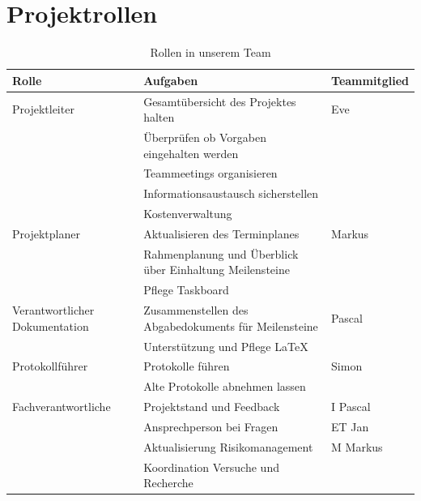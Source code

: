 \documentclass[a4paper]{report}
\begin{document}
\newpage

\section{Projektrollen}
\label{sec:ProjektRollen}
\begin{table}[h!]
	\begin{tabular}{|p{}|p{}|p{}|}
		\hline
		\textbf{Rolle} & \textbf{Aufgaben} & \textbf{Teammitglied} \\
		\hline
		Projektleiter & Gesamtübersicht des Projektes halten  & Eve \\
		& Überprüfen ob Vorgaben eingehalten werden & \\
		& Teammeetings organisieren & \\
		& Informationsaustausch sicherstellen & \\
		& Kostenverwaltung & \\
		\hline
		Projektplaner & Aktualisieren des Terminplanes & Markus\\
		& Rahmenplanung und Überblick über Einhaltung Meilensteine& \\
		& Pflege Taskboard & \\
		\hline
		Verantwortlicher Dokumentation& Zusammenstellen des Abgabedokuments für Meilensteine & Pascal \\
		& Unterstützung und Pflege LaTeX &  \\
		\hline
		Protokollführer & Protokolle führen & Simon \\
		& Alte Protokolle abnehmen lassen & \\
		\hline
		Fachverantwortliche & Projektstand und Feedback & I Pascal \\
		& Ansprechperson bei Fragen & ET Jan\\
		& Aktualisierung Risikomanagement & M Markus\\
		& Koordination Versuche und Recherche & \\
		\hline
	\end{tabular}
	\caption{Rollen in unserem Team}
	\label{tab:Projektrollen}
\end{table}
\end{document}
